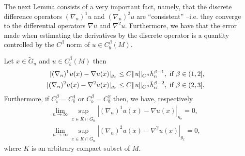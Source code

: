 \documentclass[11pt,reqno]{amsart}
\numberwithin{equation}{section}
\theoremstyle{plain}
\begin{document}
The next Lemma consists of a very important fact, namely, that the discrete difference operators $(\nabla_n)^1u$ and $(\nabla_n)^2u$ are ``consistent'' --i.e. they converge to the differential operators $\nabla u$ and $\nabla^2 u$. Furthermore, we have that the error made when estimating the derivatives by the discrete operator is a quantity controlled by the $C^\beta$ norm of  $u \in C^\beta_b(M)$.

\begin{lem}\label{lem:InterpolatedDerivativesAreCloseToRealDerivatives}
  Let $x \in \tilde G_n$ and $u\in C^\beta_b(M)$ then
  \begin{align*}
    |(\nabla_n)^1u(x)-\nabla u(x)|_{g_{x}} \leq C\|u\|_{C^\beta}\tilde h_n^{\beta-1}, \textnormal{ if } \beta \in (1,2],\\
    |(\nabla_n)^2 u(x)-\nabla^2 u(x)|_{g_{x}} \leq C\|u\|_{C^\beta}\tilde h_n^{\beta-2}, \textnormal{ if } \beta \in (2,3].	 	  
  \end{align*}	  
  Furthermore, if $C^\beta_b = C^1_b$ or $C^\beta_b = C^2_b$ then, we have, respectively
  \begin{align*}
    \lim \limits_{n\to \infty}\sup \limits_{x \in K\cap \tilde G_n} |(\nabla_n)^1u(x)-\nabla u(x)|_{g_{x}} = 0,\\
    \lim \limits_{n\to \infty}\sup \limits_{x \in K\cap \tilde G_n} |(\nabla_n)^2u(x)-\nabla^2 u(x)|_{g_{x}} = 0,	
  \end{align*}	  
  where $K$ is an arbitrary compact subset of $M$.
\end{lem}
\end{document}

